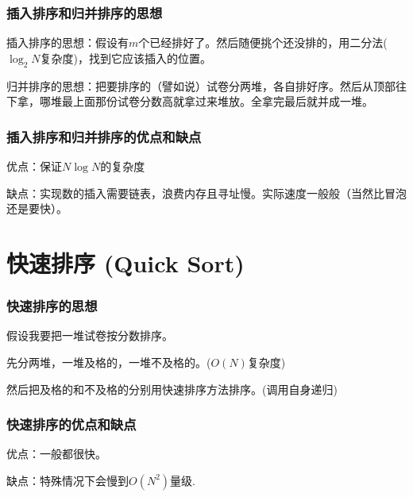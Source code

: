 \documentclass[CJK,14pt]{beamer}
\begin{document}
  \begin{frame}
    \frametitle{插入排序和归并排序的思想}
    插入排序的思想：假设有$m$个已经排好了。然后随便挑个还没排的，用二分法($\log_2N$复杂度)，找到它应该插入的位置。

    归并排序的思想：把要排序的（譬如说）试卷分两堆，各自排好序。然后从顶部往下拿，哪堆最上面那份试卷分数高就拿过来堆放。全拿完最后就并成一堆。
  \end{frame}


      \begin{frame}
    \frametitle{插入排序和归并排序的优点和缺点}
    \bitem
  \item{优点：保证$N\log N$的复杂度}
  \item{缺点：实现数的插入需要链表，浪费内存且寻址慢。实际速度一般般（当然比冒泡还是要快）。}    
    \eitem
  \end{frame}



  \section{快速排序 (Quick Sort)}

  \begin{frame}
    \frametitle{快速排序的思想}
    假设我要把一堆试卷按分数排序。
    
    先分两堆，一堆及格的，一堆不及格的。($O(N)$复杂度)

    然后把及格的和不及格的分别用快速排序方法排序。(调用自身递归)
  \end{frame}
  
\begin{frame}
  \frametitle{快速排序的优点和缺点}
    \bitem
  \item{优点：一般都很快。}
  \item{缺点：特殊情况下会慢到$O(N^2)$量级.}
    \eitem
  \end{frame}
  
\ech
\end{document}
